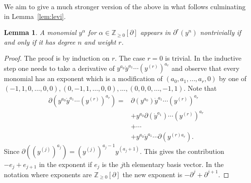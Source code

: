 \documentclass[12pt]{book}
\numberwithin{equation}{section}
\newtheorem{lemma}[theorem]{Lemma}
\theoremstyle{definition}
\theoremstyle{remark}
\newcommand{\ZZ}{\mathbb{Z}}
\begin{document}
We aim to give a much stronger version of the above in what follows culminating in Lemma~\ref{lem:levi}.
\begin{lemma}\label{lem:monomials-of-derivative}
	A monomial $y^{\alpha}$ for $\alpha \in \ZZ_{\geq 0}[\partial]$ appears in $\partial^r(y^n)$ nontrivially if and only if it has degree $n$ and weight $r$.
\end{lemma}
\begin{proof}
	The proof is by induction on $r$.
	The case $r=0$ is trivial.
	In the inductive step one needs to take a derivative of $y^{a_0} \dot{y}^{a_1}\cdots (y^{(r)})^{a_r}$ and observe that every monomial has an exponent which is a modification of $(a_0, a_1,\ldots, a_r,0)$ by one of  $(-1,1,0,\ldots, 0,0), (0,-1,1,\ldots, 0,0), \ldots, (0,0,0, \ldots, -1,1)$.
	Note that 
	\begin{align*}
	\partial(y^{a_0} \dot{y}^{a_1}\cdots (y^{(r)})^{a_r}) =& \partial(y^{a_0}) \dot{y}^{a_1}\cdots (y^{(r)})^{a_r} \\
	&+ y^{a_0} \partial(\dot{y}^{a_1})\cdots (y^{(r)})^{a_r} \\
	&+ \cdots \\
	&+ y^{a_0} \dot{y}^{a_1}\cdots \partial(y^{(r)a_r}).
	\end{align*}
	Since  $\partial((y^{(j)})^{a_j})=(y^{(j)})^{a_j-1}y^{(a_j+1)}$.
	This gives the contribution $-e_j+e_{j+1}$ in the exponent if $e_j$ is the $j$th elementary basis vector. 
	In the notation where exponents are $\ZZ_{\geq 0}[\partial]$ the new exponent is $-\partial^j + \partial^{j+1}$.
\end{proof}
\end{document}
